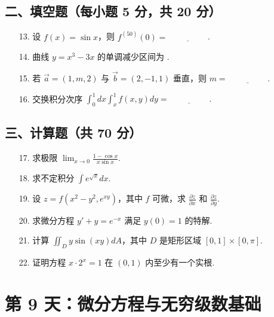 \documentclass[11pt,a4paper]{article}
\begin{document}
\subsection*{二、填空题（每小题 5 分，共 20 分）}
\begin{enumerate}
    \item[13.] 设 $f(x) = \sin x$，则 $f^{(50)}(0) = \underline{\hspace{2cm}}$.
    \item[14.] 曲线 $y = x^3 - 3x$ 的单调减少区间为 \underline{\hspace{2cm}}.
    \item[15.] 若 $\vec{a}=(1,m,2)$ 与 $\vec{b}=(2,-1,1)$ 垂直，则 $m = \underline{\hspace{2cm}}$.
    \item[16.] 交换积分次序 $\int_0^1 dx \int_x^1 f(x,y) dy = \underline{\hspace{2cm}}. $
\end{enumerate}
\subsection*{三、计算题（共 70 分）}
\begin{enumerate}
    \item[17.] 求极限 $\lim_{x \to 0} \frac{1 - \cos x}{x \sin x}$.
    \item[18.] 求不定积分 $\int e^{\sqrt{x}} dx$.
    \item[19.] 设 $z = f(x^2-y^2, e^{xy})$，其中 $f$ 可微，求 $\frac{\partial z}{\partial x}$ 和 $\frac{\partial z}{\partial y}$.
    \item[20.] 求微分方程 $y' + y = e^{-x}$ 满足 $y(0)=1$ 的特解.
    \item[21.] 计算 $\iint_D y \sin(xy) dA$，其中 $D$ 是矩形区域 $[0, 1] \times [0, \pi]$.
    \item[22.] 证明方程 $x \cdot 2^x = 1$ 在 $(0, 1)$ 内至少有一个实根.
\end{enumerate}

\newpage

\section*{第 9 天：微分方程与无穷级数基础}
\end{document}
